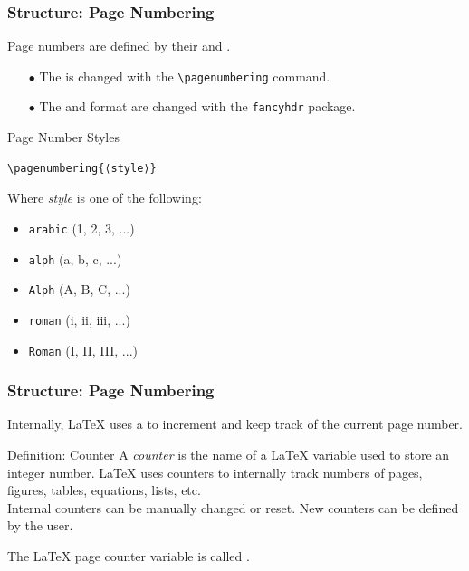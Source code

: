 \begin{frame}[fragile]
\frametitle{Structure: Page Numbering}
Page numbers are defined by their  and . \pause
\begin{itemize}
    \item[$\bullet$] The  is changed with the \verb|\pagenumbering| command. \pause
    \item[$\bullet$] The  and format are changed with the \texttt{fancyhdr} package. \pause
\end{itemize}
\begin{block}{Page Number Styles}
\begin{verbatim}
\pagenumbering{⟨style⟩}
\end{verbatim}
Where \textit{style} is one of the following:
\begin{itemize} \small
    \item \texttt{arabic} (1, 2, 3, ...)
    \item \texttt{alph} (a, b, c, ...)
    \item \texttt{Alph} (A, B, C, ...)
    \item \texttt{roman} (i, ii, iii, ...)
    \item \texttt{Roman} (I, II, III, ...)
\end{itemize}
\end{block}
\end{frame}


\begin{frame}[fragile]
\frametitle{Structure: Page Numbering}
Internally, \LaTeX{} uses a  to increment and keep track of the current page number. \pause
\begin{block}{Definition: Counter}
    A \emph{counter} is the name of a \LaTeX{} variable used to store an integer number. \LaTeX{} uses counters to internally track numbers of pages, figures, tables, equations, lists, etc. \\
    Internal counters can be manually changed or reset. New counters can be defined by the user.
\end{block} \pause 
The \LaTeX{} page counter variable is called \emph{}.
\end{frame}


